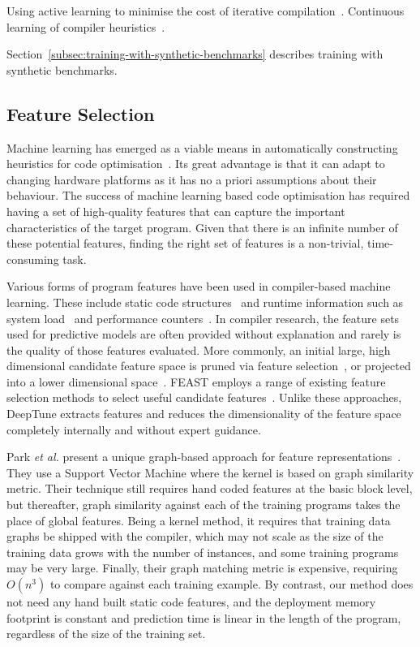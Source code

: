 Using active learning to minimise the cost of iterative compilation~\cite{Ogilvie2017}.
Continuous learning of compiler heuristics~\cite{Tartara2013,Fursin2011}.

Section~\ref{subsec:training-with-synthetic-benchmarks} describes training with synthetic benchmarks.

\subsection{Feature Selection}


Machine learning has emerged as a viable means in automatically constructing heuristics for code optimisation~\cite{Stephenson2005,Agakov,Wang2010,Kulkarni2012,Ding2015,Muralidharan2016}. Its great advantage is that it can adapt to changing hardware platforms as it has no a priori assumptions about their behaviour. The success of machine learning based code optimisation has required having a set of high-quality features that can capture the important characteristics of the target program. Given that there is an infinite number of these potential features, finding the right set of features is a non-trivial, time-consuming task.

Various forms of program features have been used in compiler-based machine learning. These include static code structures~\cite{Jiang2010} and runtime information such as system load~\cite{Wen2015} and performance counters~\cite{Dubach2009}. In compiler research, the feature sets used for predictive models are often provided without explanation and rarely is the quality of those features evaluated. More commonly, an initial large, high dimensional candidate feature space is pruned via feature selection~\cite{Stephenson2005}, or projected into a lower dimensional space~\cite{Collins2013,Dubach2007}. FEAST employs a range of existing feature selection methods to select useful candidate features~\cite{Ting2016}. Unlike these approaches, DeepTune extracts features and reduces the dimensionality of the feature space completely internally and without expert guidance.

Park \emph{et al.} present a unique graph-based approach for feature representations~\cite{Park2012}. They use a Support Vector Machine where the kernel is based on graph similarity metric. Their technique still requires hand coded features at the basic block level, but thereafter, graph similarity against each of the training programs takes the place of global features. Being a kernel method, it requires that training data graphs be shipped with the compiler, which may not scale as the size of the training data grows with the number of instances, and some training programs may be very large. Finally, their graph matching metric is expensive, requiring $O(n^3)$ to compare against each training example. By contrast, our method does not need any hand built static code features, and the deployment memory footprint is constant and prediction time is linear in the length of the program, regardless of the size of the training set.


